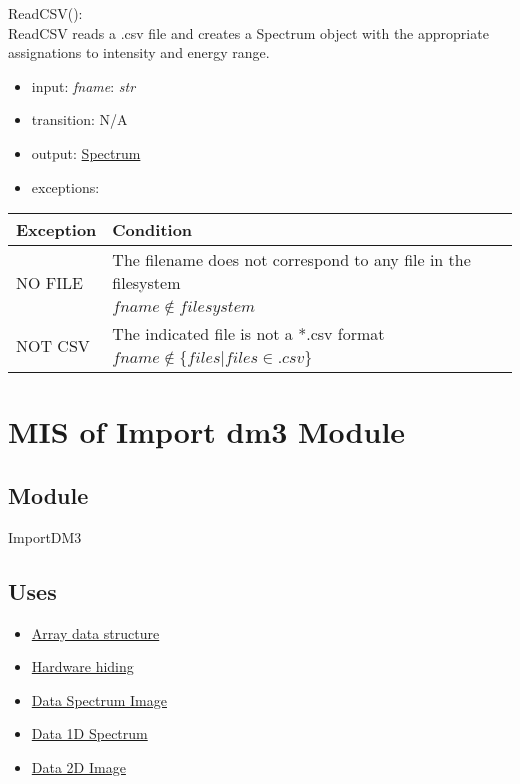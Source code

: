\documentclass[12pt, titlepage]{article}
\begin{document}
\noindent ReadCSV():\\
ReadCSV reads a .csv file and creates a Spectrum object with the appropriate assignations to intensity and energy range.
\begin{itemize}
	\item input: \textit{fname}: \textit{str}
	\item transition: N/A 
	\item output: \hyperref[Mod:Spectrum]{Spectrum}
	\item exceptions:
\end{itemize}
\begin{center}
	\begin{tabular}{p{3cm} p{12cm}}
		\toprule[0.15em]
		\textbf{Exception} & \textbf{Condition}\\
		\midrule[0.1em]
		\multirow{2}{0.25\textwidth}{NO FILE} & The filename does not correspond to any file in the filesystem\\ 
		& $fname \notin filesystem$\\ 
		\midrule[0.05em]
		\multirow{2}{0.25\textwidth}{NOT CSV} & The indicated file is not a *.csv format\\
		& $fname \notin \{files|files \in .csv\}$\\ 
		\bottomrule[0.15em]
	\end{tabular}
\end{center}


\section{MIS of Import dm3 Module} \label{Mod:ImportDM3}

\subsection{Module}

ImportDM3

\subsection{Uses}
\begin{itemize}
	\item \hyperref[Mod:Array]{Array data structure}
	\item \hyperref[Mod:HH]{Hardware hiding}
	\item \hyperref[Mod:SI]{Data Spectrum Image}
    \item \hyperref[Mod:Spectrum]{Data 1D Spectrum}
    \item \hyperref[Mod:Image]{Data 2D Image}
\end{itemize}
\end{document}
